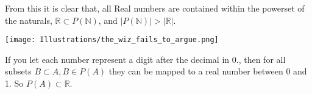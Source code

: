 From this it is clear that, all Real numbers are contained within the powerset of the naturals, $\mathbb{R} \subset P(\mathbb{N})$, and $\lvert{P(\mathbb{N})}\rvert > \lvert{\mathbb{R}}\rvert$.

\begin{minipage}{0.2\textwidth}
    \texttt{[image: Illustrations/the\_wiz\_fails\_to\_argue.png]}
\end{minipage}
\hfill
\begin{minipage}{0.75\textwidth}
    If you let each number represent a digit after the decimal in $0.$, then for all subsets $B \subset A, B \in P(A)$ they can be mapped to a real number between 0 and 1. So $P(A) \subset \mathbb{R}$.
\end{minipage}
\bigskip





